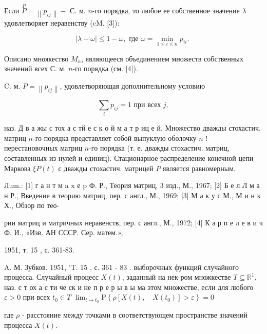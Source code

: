 \documentclass[10pt]{article}
\begin{document}
Если $\stackrel{P}{P}=\left\|p_{i j}\right\|-$ С. м. $n$-го порядка, то любое ее собственное значение $\lambda$ удовлетворяет неравенству (cM. [3]):



\[

|\lambda-\omega| \leqslant 1-\omega, \text { где } \omega=\min _{1 \leqslant i \leqslant n} p_{i i} \text {. }

\]



Описано мноякество $M_{n}$, являющееся объединением множеств собственных значений всех С. м. $n$-го порядка (см. [4]).



C. м. $P=\left\|p_{i j}\right\|$, удовлетворяющая дополнительному условию



\[

\sum_{i} p_{i j}=1 \text { при всех } j,

\]



наз. Д в а жы с тох а с тй е с к о й м а т р иц е й. Множество дважды стохастич. матриц $n$-го порядка представляет собой выпуклую оболочку $n$ ! перестановочных матриц $n$-го порядка (т. е. дважды стохастич. матриц, составленных из нулей и единиц). Стационарное распределение конечной цепи Маркова $\xi P(t)$ с дважды стохастич. матрицей $P$ является равномерным.



Лum.: [1] г а н т м a $\mathrm{x}$ е $\mathrm{p}$ Ф. Р., Теория матриц, 3 изд., М., 1967; [2] Б е л Л м а н Р., Введение в теорию матриц, пер. с англ., М., 1969; [3] М а к у с М., М и н к Х., Обзор по тео-

рии матриц и матричных неравенств, пер. с англ., М., 1972; [4] К а р п е л е в и ч Ф. И., «Изв. АН СССР. Сер. матем.»,

1951, т. 15 , с. 361-83.

A. М. Зубков. 1951, 'T. 15 , с. 361 - 83 . выборочных функций случайного процесса. Случайный процесс $X(t)$, заданный на нек-ром множкестве $T \subseteq \mathbb{R}^{1}$, наз. с т ох а с ти че ск и не п р е р ы в ы ма этом множестве, если для любого $\varepsilon>0$ при всех $t_{0} \in T$ $\lim _{t \rightarrow t_{0}} \mathrm{P}\left\{\rho\left[X(t), \quad X\left(t_{0}\right)\right]>\varepsilon\right\}=0$



где $\rho$ - расстояние между точками в соответствующем пространстве значений процесса $X(t)$.
\end{document}
